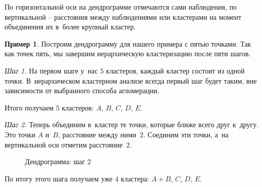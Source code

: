 \documentclass[12pt,a4paper]{article}
\theoremstyle{definition}
\newtheorem{example}{Пример}
\begin{document}
По горизонтальной оси на дендрограмме 
отмечаются сами наблюдения, по вертикальной – расстояния между наблюдениями или кластерами 
на момент объединения их в~более крупный кластер.

\begin{example}
Построим дендрограмму для нашего примера с пятью точками. Так как 
точек пять, мы завершим иерархическую кластеризацию после пяти шагов.

\textit{Шаг 1.} На первом шаге у~нас $5$ кластеров, каждый кластер состоит 
из одной точки. В~иерархическом кластерном анализе всегда первый шаг 
будет таким, вне зависимости от выбранного способа агломерации.

Итого получаем $5$ кластеров: $A$, $B$, $C$, $D$, $E$.


\textit{Шаг 2.} Теперь объединим в~кластер те точки, которые ближе всего 
друг к~другу. Это точки $A$ и~$B$, расстояние между ними~$2$. Соединим эти 
точки, а~на вертикальной оси отметим расстояние~$2$. 

\begin{figure}[ht!]
\centering
{}
\caption{Дендрограмма: шаг 2}
\end{figure}
По итогу этого шага получаем уже $4$ кластера: $A+B$, $C$, $D$, $E$.



\end{example}
\end{document}
